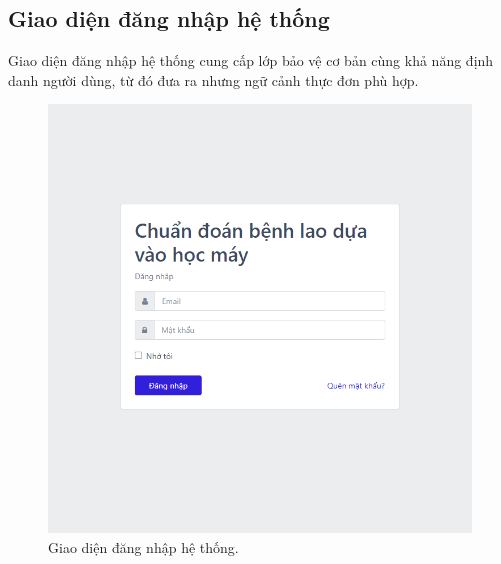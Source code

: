 \subsection{Giao diện đăng nhập hệ thống}
Giao diện đăng nhập hệ thống cung cấp lớp bảo vệ cơ bản cùng khả năng định danh người dùng, từ đó đưa ra nhưng ngữ cảnh thực đơn phù hợp.
\begin{figure}[H]
	\centering
	\includegraphics[width=1\linewidth]{images/giaodien_dangnhap}
	\caption{Giao diện đăng nhập hệ thống.}
	\label{fig:giaodien_dangnhap}
\end{figure}

